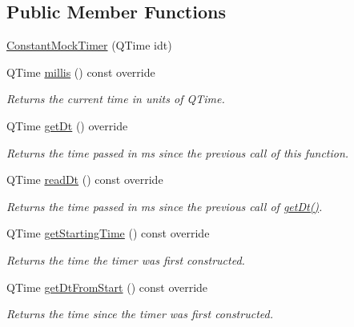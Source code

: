 \subsection*{Public Member Functions}
\begin{DoxyCompactItemize}
\item 
\mbox{\hyperlink{classokapi_1_1ConstantMockTimer_a7ed0cb52e828ac06d890817538036317}{Constant\+Mock\+Timer}} (Q\+Time idt)
\item 
Q\+Time \mbox{\hyperlink{classokapi_1_1ConstantMockTimer_a9d392210167523ca4f8cf849f9746a08}{millis}} () const override
\begin{DoxyCompactList}\small\item\em Returns the current time in units of Q\+Time. \end{DoxyCompactList}\item 
Q\+Time \mbox{\hyperlink{classokapi_1_1ConstantMockTimer_a35956bfe4078dbf73d67828cb41f9e26}{get\+Dt}} () override
\begin{DoxyCompactList}\small\item\em Returns the time passed in ms since the previous call of this function. \end{DoxyCompactList}\item 
Q\+Time \mbox{\hyperlink{classokapi_1_1ConstantMockTimer_a5e0e09fe1e256e6076ace75d914d4ec6}{read\+Dt}} () const override
\begin{DoxyCompactList}\small\item\em Returns the time passed in ms since the previous call of \mbox{\hyperlink{classokapi_1_1ConstantMockTimer_a35956bfe4078dbf73d67828cb41f9e26}{get\+Dt()}}. \end{DoxyCompactList}\item 
Q\+Time \mbox{\hyperlink{classokapi_1_1ConstantMockTimer_a1b0681828c4a29389b1179acee2850d8}{get\+Starting\+Time}} () const override
\begin{DoxyCompactList}\small\item\em Returns the time the timer was first constructed. \end{DoxyCompactList}\item 
Q\+Time \mbox{\hyperlink{classokapi_1_1ConstantMockTimer_a963100e681f49c616d7474ab483e1a53}{get\+Dt\+From\+Start}} () const override
\begin{DoxyCompactList}\small\item\em Returns the time since the timer was first constructed. \end{DoxyCompactList}\item 

\end{DoxyCompactItemize}
